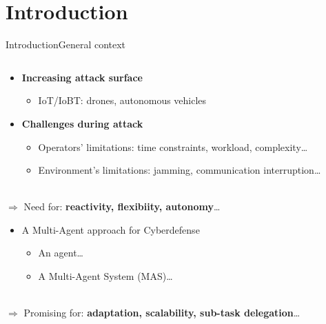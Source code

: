 \section{Introduction}

\begin{frame}{Introduction}{General context}

    \begin{columns}

        \begin{column}{0.7\textwidth}

            \begin{itemize}
                \item \textbf{Increasing attack surface}
                      \begin{itemize}
                          \item IoT/IoBT: drones, autonomous vehicles
                      \end{itemize}
                \item \textbf{Challenges during attack}
                      \begin{itemize}
                          \item Operators' limitations: time constraints, workload, complexity\dots
                          \item Environment's limitations: jamming, communication interruption\dots
                      \end{itemize}
            \end{itemize}

            \ \\

            $\Longrightarrow$ Need for: \textbf{reactivity, flexibiity, autonomy}\dots

            \begin{itemize}
                \item A Multi-Agent approach for Cyberdefense
                      \begin{itemize}
                          \item An agent\dots
                          \item A Multi-Agent System (MAS)\dots
                      \end{itemize}
            \end{itemize}

            \ \\

            $\Longrightarrow$ Promising for: \textbf{adaptation, scalability, sub-task delegation}\dots


\end{column}
\end{columns}
\end{frame}
